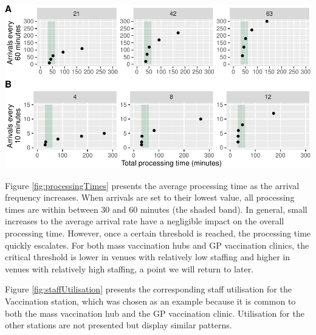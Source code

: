 \documentclass{article}
\let\origfigure\figure
\let\endorigfigure\endfigure
\renewenvironment{figure}[1][2] {
    \expandafter\origfigure\expandafter[H]
} {
    \endorigfigure
}
\begin{document}
\begin{figure}

{\centering \includegraphics{Preprint_files/figure-latex/processingTimes-1} 

}

\caption{Average processing times by arrival frequency for a mass vaccination hub (A) and a GP vaccination clinic (B)}\label{fig:processingTimes}
\end{figure}

Figure \ref{fig:processingTimes} presents the average processing time as
the arrival frequency increases. When arrivals are set to their lowest
value, all processing times are within between 30 and 60 minutes (the
shaded band). In general, small increases to the average arrival rate
have a negligible impact on the overall processing time. However, once a
certain threshold is reached, the processing time quickly escalates. For
both mass vaccination hubs and GP vaccination clinics, the critical
threshold is lower in venues with relatively low staffing and higher in
venues with relatively high staffing, a point we will return to later.

Figure \ref{fig:staffUtilisation} presents the corresponding staff
utilisation for the Vaccination station, which was chosen as an example
because it is common to both the mass vaccination hub and the GP
vaccination clinic. Utilisation for the other stations are not presented
but display similar patterns.
\end{document}
